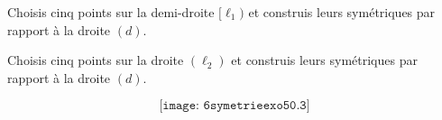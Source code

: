 \begin{myenumerate}
\item Choisis cinq points sur la demi-droite $[\ell_1)$ et construis leurs
  symétriques par rapport à la droite $(d)$.
\item Choisis cinq points sur la droite $(\ell_2)$ et construis
  leurs symétriques par rapport à la droite $(d)$.
\end{myenumerate}
\[\texttt{[image: 6symetrieexo50.3]}\]